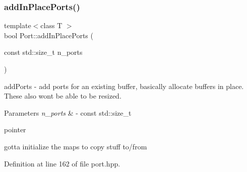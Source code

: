 \subsubsection{\texorpdfstring{add\+In\+Place\+Ports()}{addInPlacePorts()}}
{\footnotesize\ttfamily template$<$class T $>$ \\
bool Port\+::add\+In\+Place\+Ports (\begin{DoxyParamCaption}\item[{const std\+::size\+\_\+t}]{n\+\_\+ports }\end{DoxyParamCaption})\hspace{0.3cm}{\ttfamily [inline]}}

add\+Ports -\/ add ports for an existing buffer, basically allocate buffers in place. These also won\textquotesingle{}t be able to be resized. 
\begin{DoxyParams}{Parameters}
{\em n\+\_\+ports} & -\/ const std\+::size\+\_\+t \\
\hline
\end{DoxyParams}
pointer

gotta initialize the maps to copy stuff to/from 

Definition at line 162 of file port.\+hpp.


